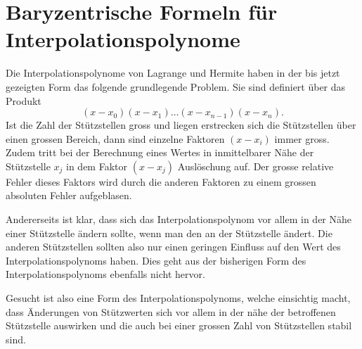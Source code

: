 %
%
%
\section{Baryzentrische Formeln für Interpolationspolynome
\label{buch:section:baryzentrisch}}
Die Interpolationspolynome von Lagrange und Hermite haben 
in der bis jetzt gezeigten Form das folgende grundlegende Problem.
Sie sind definiert über das Produkt
\[
(x-x_0)(x-x_1)\dots (x-x_{n-1})(x-x_n).
\]
Ist die Zahl der Stützstellen gross und liegen erstrecken sich die 
Stützstellen über einen grossen Bereich, dann sind einzelne Faktoren
$(x-x_i)$ immer gross.
Zudem tritt bei der Berechnung eines Wertes in inmittelbarer 
Nähe der Stützstelle $x_j$ in dem Faktor $(x-x_j)$ Auslöschung auf.
Der grosse relative Fehler dieses Faktors wird durch die anderen Faktoren
zu einem grossen absoluten Fehler aufgeblasen.

Andererseits ist klar, dass sich das Interpolationspolynom vor allem
in der Nähe einer Stützstelle ändern sollte, wenn man den an der
Stützstelle ändert.
Die anderen Stützstellen sollten also nur einen geringen Einfluss auf
den Wert des Interpolationspolynoms haben.
Dies geht aus der bisherigen Form des Interpolationspolynoms ebenfalls
nicht hervor.

Gesucht ist also eine Form des Interpolationspolynoms, welche einsichtig
macht, dass Änderungen von Stützwerten sich vor allem in der nähe der
betroffenen Stützstelle auswirken und die auch bei einer grossen Zahl
von Stützstellen stabil sind.


